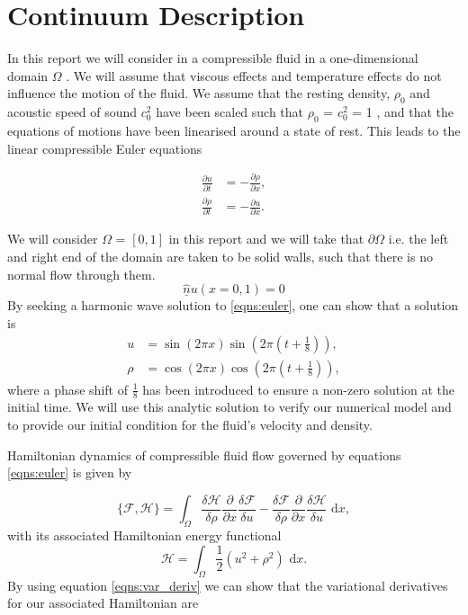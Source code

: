 \documentclass[a4paper,11pt]{article}
\begin{document}
\section{Continuum Description}

In this report we will consider in a compressible fluid in a one-dimensional domain $\Omega$ . We will assume that viscous effects and temperature effects do not influence the motion of the fluid. We assume that the resting density, $\rho_0$ and acoustic speed of sound $c^2_0$ have been scaled such that $\rho_0$ =  $c^2_0$ = 1  , and that the  equations of motions  have been linearised around a state of rest. This leads to the linear compressible Euler equations

\begin{equation}\label{eqns:euler}
\begin{aligned}
\frac{\partial u }{\partial t} &= - \frac{\partial \rho }{\partial x},\\
\frac{\partial \rho }{\partial t} &= -\frac{\partial u }{\partial x}.
\end{aligned}
\end{equation}

We will consider $\Omega$ = $[0,1]$ in this report and we will take that $\partial \Omega$ i.e. the left and right end of the domain are taken to be solid walls, such that there is no normal flow through them. 
\[ \hat{\underline{n}}u(x=0,1) = 0\]
By seeking a harmonic wave solution to \eqref{eqns:euler}, one can show that a solution is 
\begin{equation*}
\begin{aligned}
u &=  \sin(2\pi x )\sin(2\pi(t+\frac{1}{8})),\\
\rho &=  \cos(2\pi x) \cos(2\pi (t + \frac{1}{8})),
\end{aligned}
\end{equation*}
where a phase shift of $\frac{1}{8}$ has been introduced to ensure a non-zero solution at the initial time. We will use this analytic solution to verify our numerical model and to provide our initial condition for the fluid's velocity and density.


Hamiltonian dynamics of compressible fluid flow governed by equations \eqref{eqns:euler} is given by

\begin{equation}\label{eqns:pb} \{ \mathcal{F},  \mathcal{H}\} = \int_\Omega \frac{\delta  \mathcal{H}}{\delta \rho} \frac{\partial}{\partial x}\frac{\delta  \mathcal{F}}{\delta u} - \frac{\delta  \mathcal{F}}{\delta \rho} \frac{\partial}{\partial x}\frac{\delta  \mathcal{H}}{\delta u} \text{ d}x,\end{equation}
with its associated Hamiltonian energy functional
\[  \mathcal{H} = \int_\Omega \frac{1}{2} ( u^2 + \rho^2) \text{ d}x.\]
By using equation \eqref{eqns:var_deriv} we can show  that the variational derivatives for our associated Hamiltonian are
\end{document}
